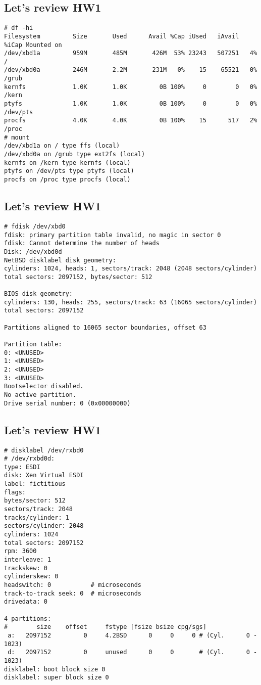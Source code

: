 \documentclass[xga]{xdvislides}
\begin{document}
\subsection{Let's review HW1}
\begin{verbatim}
# df -hi
Filesystem         Size       Used      Avail %Cap iUsed   iAvail %iCap Mounted on
/dev/xbd1a         959M       485M       426M  53% 23243   507251   4% /
/dev/xbd0a         246M       2.2M       231M   0%    15    65521   0% /grub
kernfs             1.0K       1.0K         0B 100%     0        0   0% /kern
ptyfs              1.0K       1.0K         0B 100%     0        0   0% /dev/pts
procfs             4.0K       4.0K         0B 100%    15      517   2% /proc
# mount
/dev/xbd1a on / type ffs (local)
/dev/xbd0a on /grub type ext2fs (local)
kernfs on /kern type kernfs (local)
ptyfs on /dev/pts type ptyfs (local)
procfs on /proc type procfs (local)
\end{verbatim}


\subsection{Let's review HW1}
\small
\begin{verbatim}
# fdisk /dev/xbd0
fdisk: primary partition table invalid, no magic in sector 0
fdisk: Cannot determine the number of heads
Disk: /dev/xbd0d
NetBSD disklabel disk geometry:
cylinders: 1024, heads: 1, sectors/track: 2048 (2048 sectors/cylinder)
total sectors: 2097152, bytes/sector: 512

BIOS disk geometry:
cylinders: 130, heads: 255, sectors/track: 63 (16065 sectors/cylinder)
total sectors: 2097152

Partitions aligned to 16065 sector boundaries, offset 63

Partition table:
0: <UNUSED>
1: <UNUSED>
2: <UNUSED>
3: <UNUSED>
Bootselector disabled.
No active partition.
Drive serial number: 0 (0x00000000)
\end{verbatim}
\Normalsize

\subsection{Let's review HW1}
\small
\begin{verbatim}
# disklabel /dev/rxbd0
# /dev/rxbd0d:
type: ESDI
disk: Xen Virtual ESDI
label: fictitious
flags:
bytes/sector: 512
sectors/track: 2048
tracks/cylinder: 1
sectors/cylinder: 2048
cylinders: 1024
total sectors: 2097152
rpm: 3600
interleave: 1
trackskew: 0
cylinderskew: 0
headswitch: 0           # microseconds
track-to-track seek: 0  # microseconds
drivedata: 0 

4 partitions:
#        size    offset     fstype [fsize bsize cpg/sgs]
 a:   2097152         0     4.2BSD      0     0     0 # (Cyl.      0 -   1023)
 d:   2097152         0     unused      0     0       # (Cyl.      0 -   1023)
disklabel: boot block size 0
disklabel: super block size 0
\end{verbatim}
\Normalsize
\end{document}
